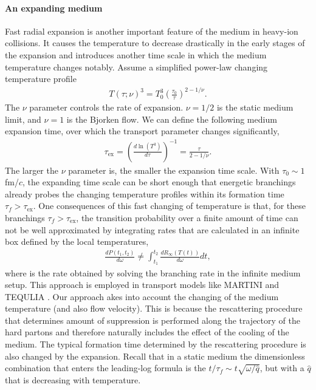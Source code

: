 \paragraph{An expanding medium}
Fast radial expansion is another important feature of the medium in heavy-ion collisions.
It causes the temperature to decrease drastically in the early stages of the expansion and introduces another time scale in which the medium temperature changes notably.
Assume a simplified power-law changing temperature profile
\begin{eqnarray}
T(\tau; \nu)^3 = T_0^3\left(\frac{\tau_0}{\tau}\right)^{2-1/\nu}.
\end{eqnarray}
The $\nu$ parameter controls the rate of expansion. 
$\nu = 1/2$ is the static medium limit, and $\nu=1$ is the Bjorken flow.
We can define the following medium expansion time, over which the transport parameter changes significantly,
\begin{eqnarray}
\tau_{\textrm{ex}} = \left(\frac{d\ln(T^3)}{d \tau} \right)^{-1} = \frac{\tau}{2-1/\nu}.
\end{eqnarray}
The larger the $\nu$ parameter is, the smaller the expansion time scale.
With $\tau_0 \sim 1$ fm/$c$, the expanding time scale can be short enough that energetic branchings already probes the changing temperature profiles within its formation time $\tau_f > \tau_{\textrm{ex}}$.
One consequences of this fast changing of temperature is that, for these branchings $\tau_f > \tau_{\textrm{ex}}$, the transition probability over a finite amount of time can not be well approximated by integrating rates that are calculated in an infinite box defined by the local temperatures,
\begin{eqnarray}
\frac{dP(t_1, t_2)}{d\omega} \neq \int_{t_1}^{t_2} \frac{dR_{\infty}(T(t))}{d\omega} dt,
\end{eqnarray}
where is the rate obtained by solving the branching rate in the infinite medium setup. 
This approach is employed in transport models like MARTINI and TEQULIA \cite{Jeon:2003gi,Schenke:2009gb,Dai:2019hbi}.
Our approach akes into account the changing of the medium temperature (and also flow velocity).
This is because the rescattering procedure that determines amount of suppression is performed along the trajectory of the hard partons and therefore naturally includes the effect of the cooling of the medium.
The typical formation time determined by the rescattering procedure is also changed by the expansion.
Recall that in a static medium the dimensionless combination that enters the leading-log formula is the $t/\tau_f \sim t \sqrt{\omega/\hat{q}}$, but with a $\hat{q}$ that is decreasing with temperature.
